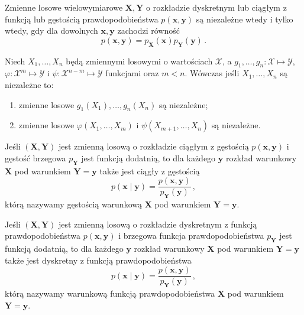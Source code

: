 \documentclass{myclass}
\numberwithin{equation}{subsection}
\begin{document}
\begin{theorem}
Zmienne losowe wielowymiarowe \(\mathbf{X}, \mathbf{Y}\) o rozkładzie dyskretnym lub ciągłym z
funkcją lub gęstością prawdopodobieństwa \(p(\mathbf{x},\mathbf{y})\) są niezależne wtedy i tylko
wtedy, gdy dla dowolnych \(\mathbf{x}, \mathbf{y}\) zachodzi równość
\begin{equation*}
    p(\mathbf{x}, \mathbf{y}) = p_\mathbf{X}(\mathbf{x}) p_\mathbf{Y}(\mathbf{y})\,.    
\end{equation*}
\end{theorem}

\begin{theorem}
Niech \(X_1,\ldots,X_n\) będą zmiennymi losowymi o wartościach \(\mathcal{X}\), a \(g_1,\ldots,g_n:
\mathcal{X} \mapsto \mathcal{Y}\), \(\varphi: \mathcal{X}^m \mapsto \mathcal{Y}\) i \(\psi:
\mathcal{X}^{n-m}\mapsto\mathcal{Y}\) funkcjami oraz \(m < n\). Wówczas jeśli \(X_1,\ldots,X_n\) są
niezależne to:
\begin{enumerate}
    
    \item zmienne losowe \(g_1(X_1),\ldots,g_n(X_n)\) są niezależne;

    \item zmienne losowe \(\varphi(X_1,\ldots,X_m)\) i \(\psi(X_{m+1},\ldots,X_n)\) są niezależne.

\end{enumerate}
\end{theorem}

Jeśli \((\mathbf{X}, \mathbf{Y})\) jest zmienną losową o rozkładzie ciągłym z gęstością
\(p(\mathbf{x}, \mathbf{y})\) i gęstość brzegowa \(p_\mathbf{Y}\) jest funkcją dodatnią, to dla
każdego \(\mathbf{y}\) rozkład warunkowy \(\mathbf{X}\) pod warunkiem \(\mathbf{Y} = \mathbf{y}\)
także jest ciągły z gęstością
\begin{equation}
    p(\mathbf{x} \mid \mathbf{y}) = \frac{p(\mathbf{x}, \mathbf{y})}{p_\mathbf{Y}(\mathbf{y})}\,,
\end{equation}
którą nazywamy gęstością warunkową \(\mathbf{X}\) pod warunkiem \(\mathbf{Y} = \mathbf{y}\).

Jeśli \((\mathbf{X}, \mathbf{Y})\) jest zmienną losową o rozkładzie dyskretnym z funkcją
prawdopodobieństwa \(p(\mathbf{x}, \mathbf{y})\) i brzegowa funkcja prawdopodobieństwa
\(p_\mathbf{Y}\) jest funkcją dodatnią, to dla każdego \(\mathbf{y}\) rozkład warunkowy
\(\mathbf{X}\) pod warunkiem \(\mathbf{Y} = \mathbf{y}\) także jest dyskretny z funkcją
prawdopodobieństwa
\begin{equation}
    p(\mathbf{x} \mid \mathbf{y}) = \frac{p(\mathbf{x}, \mathbf{y})}{p_\mathbf{Y}(\mathbf{y})}\,,
\end{equation}
którą nazywamy warunkową funkcją prawdopodobieństwa \(\mathbf{X}\) pod warunkiem \(\mathbf{Y} =
\mathbf{y}\).
\end{document}
